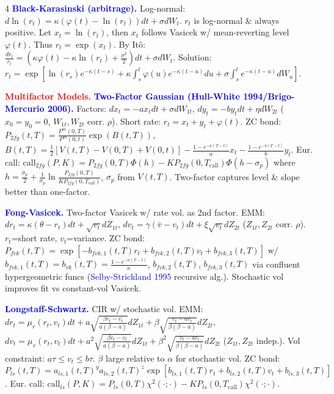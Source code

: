 \documentclass[landscape]{article}
\begin{document}
\begin{multicols}{4}
\textcolor{blue}{\textbf{Black-Karasinski (arbitrage).}} Log-normal: $d\ln(r_t)=\kappa(\varphi(t)-\ln(r_t))dt+\sigma dW_t$. $r_t$ is log-normal \& always positive. Let $x_t=\ln(r_t)$, then $x_t$ follows Vasicek w/ mean-reverting level $\varphi(t)$. Thus $r_t=\exp(x_t)$. By Itô: $\frac{dr_t}{r_t}=(\kappa\varphi(t)-\kappa\ln(r_t)+\frac{\sigma^2}{2})dt+\sigma dW_t$. Solution: $r_t=\exp[\ln(r_s)e^{-\kappa(t-s)}+\kappa\int_s^t\varphi(u)e^{-\kappa(t-u)}du+\sigma\int_s^t e^{-\kappa(t-u)}dW_u]$.

\textcolor{red}{\textbf{Multifactor Models.}}
\textcolor{blue}{\textbf{Two-Factor Gaussian (Hull-White 1994/Brigo-Mercurio 2006).}} Factors: $dx_t=-ax_t dt+\sigma dW_{1t}$, $dy_t=-by_t dt+\eta dW_{2t}$ ($x_0=y_0=0$, $W_{1t},W_{2t}$ corr. $\rho$). Short rate: $r_t=x_t+y_t+\varphi(t)$. ZC bond: $P_{2fg}(t,T)=\frac{P^m(0,T)}{P^m(0,t)}\exp(B(t,T))$, $B(t,T)=\frac{1}{2}[V(t,T)-V(0,T)+V(0,t)]-\frac{1-e^{-a(T-t)}}{a}x_t-\frac{1-e^{-b(T-t)}}{b}y_t$. Eur. call: $\text{call}_{2fg}(P,K)=P_{2fg}(0,T)\Phi(h)-KP_{2fg}(0,T_{\text{call}})\Phi(h-\sigma_p)$ where $h=\frac{\sigma_p}{2}+\frac{1}{\sigma_p}\ln\frac{P_{2fg}(0,T)}{KP_{2fg}(0,T_{\text{call}})}$, $\sigma_p$ from $V(t,T)$. Two-factor captures level \& slope better than one-factor.

\textcolor{blue}{\textbf{Fong-Vasicek.}} Two-factor Vasicek w/ rate vol. as 2nd factor. EMM: $dr_t=\kappa(\theta-r_t)dt+\sqrt{v_t}dZ_{1t}$, $dv_t=\gamma(\bar{v}-v_t)dt+\xi\sqrt{v_t}dZ_{2t}$ ($Z_{1t},Z_{2t}$ corr. $\rho$). $r_t$=short rate, $v_t$=variance. ZC bond: $P_{fvk}(t,T)=\exp[-b_{fvk,1}(t,T)r_t+b_{fvk,2}(t,T)v_t+b_{fvk,3}(t,T)]$ w/ $b_{fvk,1}(t,T)=b_{vk}(t,T)=\frac{1-e^{-\kappa(T-t)}}{\kappa}$, $b_{fvk,2}(t,T)$, $b_{fvk,3}(t,T)$ via confluent hypergeometric funcs (\textcolor{blue}{Selby-Strickland 1995} recursive alg.). Stochastic vol improves fit vs constant-vol Vasicek.

\textcolor{blue}{\textbf{Longstaff-Schwartz.}} CIR w/ stochastic vol. EMM: $dr_t=\mu_r(r_t,v_t)dt+a\sqrt{\frac{\beta r_t-v_t}{a(\beta-a)}}dZ_{1t}+\beta\sqrt{\frac{v_t-ar_t}{\beta(\beta-a)}}dZ_{2t}$, $dv_t=\mu_v(r_t,v_t)dt+a^2\sqrt{\frac{\beta r_t-v_t}{a(\beta-a)}}dZ_{1t}+\beta^2\sqrt{\frac{v_t-ar_t}{\beta(\beta-a)}}dZ_{2t}$ ($Z_{1t},Z_{2t}$ indep.). Vol constraint: $a\tau\leq v_t\leq b\tau$. $\beta$ large relative to $\alpha$ for stochastic vol. ZC bond: $P_{ls}(t,T)=a_{ls,1}(t,T)^y a_{ls,2}(t,T)^z\exp[b_{ls,1}(t,T)r_t+b_{ls,2}(t,T)v_t+b_{ls,3}(t,T)]$. Eur. call: $\text{call}_{ls}(P,K)=P_{ls}(0,T)\chi^2(\cdot;\cdot)-KP_{ls}(0,T_{\text{call}})\chi^2(\cdot;\cdot)$.


\end{multicols}
\end{document}
